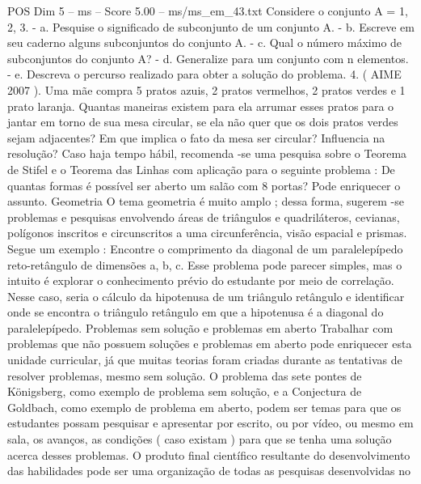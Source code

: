 \begin{textsample}{POS Dim 5 – ms – Score 5.00 – ms/ms\_em\_43.txt}
Considere o conjunto A = 1, 2, 3. - a.
Pesquise o significado de subconjunto de um conjunto A. - b.
Escreve em seu caderno alguns subconjuntos do conjunto A. - c.
Qual o número máximo de subconjuntos do conjunto A? - d.
Generalize para um conjunto com n elementos. - e.
Descreva o percurso realizado para obter a solução do problema. 4. ( AIME 2007 ).
Uma mãe compra 5 pratos azuis, 2 pratos vermelhos, 2 pratos verdes e 1 prato laranja.
Quantas maneiras existem para ela arrumar esses pratos para o jantar em torno de sua mesa circular, se ela não quer que os dois pratos verdes sejam adjacentes?
Em que implica o fato da mesa ser circular?
Influencia na resolução?
Caso haja tempo hábil, recomenda -se uma pesquisa sobre o Teorema de Stifel e o Teorema das Linhas com aplicação para o seguinte problema : De quantas formas é possível ser aberto um salão com 8 portas?
Pode enriquecer o assunto.
Geometria O tema geometria é muito amplo ; dessa forma, sugerem -se problemas e pesquisas envolvendo áreas de triângulos e quadriláteros, cevianas, polígonos inscritos e circunscritos a uma circunferência, visão espacial e prismas.
Segue um exemplo : Encontre o comprimento da diagonal de um paralelepípedo reto-retângulo de dimensões a, b, c.
Esse problema pode parecer simples, mas o intuito é explorar o conhecimento prévio do estudante por meio de correlação.
Nesse caso, seria o cálculo da hipotenusa de um triângulo retângulo e identificar onde se encontra o triângulo retângulo em que a hipotenusa é a diagonal do paralelepípedo.
Problemas sem solução e problemas em aberto Trabalhar com problemas que não possuem soluções e problemas em aberto pode enriquecer esta unidade curricular, já que muitas teorias foram criadas durante as tentativas de resolver problemas, mesmo sem solução.
O problema das sete pontes de Königsberg, como exemplo de problema sem solução, e a Conjectura de Goldbach, como exemplo de problema em aberto, podem ser temas para que os estudantes possam pesquisar e apresentar por escrito, ou por vídeo, ou mesmo em sala, os avanços, as condições ( caso existam ) para que se tenha uma solução acerca desses problemas.
O produto final científico resultante do desenvolvimento das habilidades pode ser uma organização de todas as pesquisas desenvolvidas no

\end{textsample}
